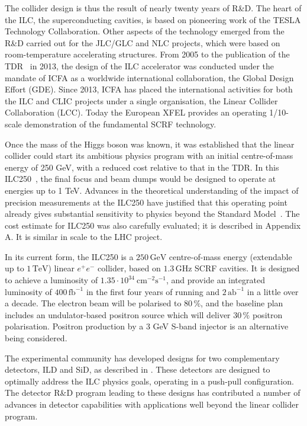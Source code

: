\documentclass[%
 reprint,
 floatfix,
 amsmath,amssymb,
 aps,
]{revtex4-1}
\begin{document}
The collider design is thus the result of nearly twenty years of
R\&D. The heart of the ILC, the superconducting cavities, is based on
pioneering work of the TESLA Technology Collaboration. Other aspects of the 
technology
emerged from the R\&D carried out for the JLC/GLC and NLC projects,
which were based on room-temperature accelerating structures. From
2005 to the publication of the TDR~\cite{Behnke:2013xla} in 2013, the
design of the ILC accelerator was conducted under the mandate of ICFA
as a worldwide
international collaboration, the Global Design Effort (GDE). 
Since 2013, ICFA has placed the  international activities for both the ILC and CLIC
projects under a single organisation, 
the Linear Collider Collaboration (LCC).
Today the European XFEL provides an operating 1/10-scale demonstration of the fundamental SCRF technology.


Once the mass of the Higgs boson was known, it was established that the
linear collider could start its ambitious physics program with an initial centre-of-mass energy of 250 GeV, with a reduced cost relative to that in the TDR.  In this ILC250~\cite{Evans:2017rvt}, the final focus and beam dumps would be designed to operate at energies up to 1 TeV.
Advances in the theoretical understanding of the impact of precision
measurements at the 
 ILC250 have justified that this operating point already gives
 substantial 
sensitivity to physics beyond the Standard 
Model~\cite{Barklow:2017suo,Fujii:2017vwa}. 
 The cost estimate for ILC250 was also carefully evaluated;
it is described in Appendix A. It is similar in scale to the
LHC 
project.


In its current
form, the ILC250 is a $250\,{\mathrm{GeV}}$ centre-of-mass energy
(extendable up to $1\,{\mathrm{TeV}}$) linear $e^+e^-$ collider, based
on $1.3\,{\mathrm{GHz}}$  SCRF
cavities. It is designed to achieve a luminosity of $1.35\cdot
10^{34}~{\mathrm{cm}}^{-2}{\mathrm{s}}^{-1}$, and provide an integrated
luminosity of $400\,{\mathrm{fb}}^{-1}$ in the first four years of
running and $2\,{\mathrm{ab}}^{-1}$ in a little over a decade. The electron beam will be polarised to $80\,\%$, and the baseline plan includes an 
undulator-based
positron source which will  deliver
$30\,\%$ positron  polarisation. 
Positron production by a 3 GeV S-band injector
is an alternative being considered.


The experimental community has developed
designs for two complementary detectors, ILD and SiD, 
as described in \cite{Behnke:2013lya}. These detectors are designed to 
optimally address the
ILC physics goals, operating in a push-pull configuration.  
The detector R\&D program leading to these designs
has 
contributed a number of advances in 
detector capabilities with applications well beyond the linear
collider program. 
\end{document}
